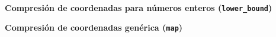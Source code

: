 \textbf{Compresión de coordenadas para números enteros (\texttt{lower\_bound})}


\textbf{Compresión de coordenadas genérica (\texttt{map})}
